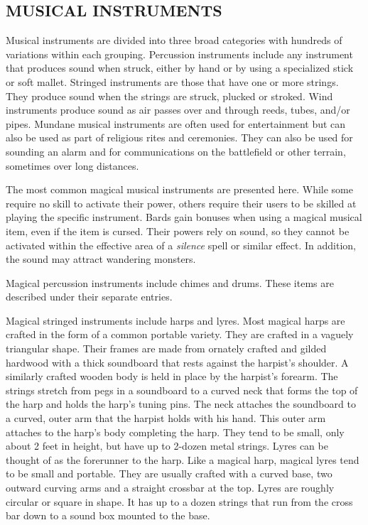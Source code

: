 \begin{multicols}{2}
\subsection{MUSICAL INSTRUMENTS}

Musical instruments are divided into three broad categories with hundreds of variations within each grouping.  Percussion instruments include any instrument that produces sound when struck, either by hand or by using a specialized stick or soft mallet.  Stringed instruments are those that have one or more strings.  They produce sound when the strings are struck, plucked or stroked.  Wind instruments produce sound as air passes over and through reeds, tubes, and/or pipes.  Mundane musical instruments are often used for entertainment but can also be used as part of religious rites and ceremonies.  They can also be used for sounding an alarm and for communications on the battlefield or other terrain, sometimes over long distances.

The most common magical musical instruments are presented here.  While some require no skill to activate their power, others require their users to be skilled at playing the specific instrument.  Bards gain bonuses when using a magical musical item, even if the item is cursed.  Their powers rely on sound, so they cannot be activated within the effective area of a \textit{silence} spell or similar effect.  In addition, the sound may attract wandering monsters.  

Magical percussion instruments include chimes and drums.  These items are described under their separate entries.

Magical stringed instruments include harps and lyres.  Most magical harps are crafted in the form of a common portable variety.  They are crafted in a vaguely triangular shape.  Their frames are made from ornately crafted and gilded hardwood with a thick soundboard that rests against the harpist's shoulder.  A similarly crafted wooden body is held in place by the harpist's forearm.  The strings stretch from pegs in a soundboard to a curved neck that forms the top of the harp and holds the harp's tuning pins.  The neck attaches the soundboard to a curved, outer arm that the harpist holds with his hand.  This outer arm attaches to the harp's body completing the harp.  They tend to be small, only about 2 feet in height, but have up to 2-dozen metal strings.  Lyres can be thought of as the forerunner to the harp.  Like a magical harp, magical lyres tend to be small and portable.  They are usually crafted with a curved base, two outward curving arms and a straight crossbar at the top.  Lyres are roughly circular or square in shape.  It has up to a dozen strings that run from the cross bar down to a sound box mounted to the base.


\end{multicols}
